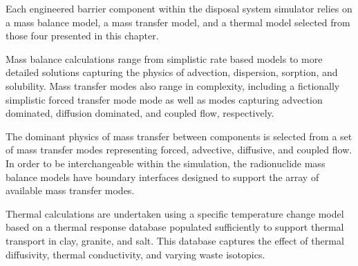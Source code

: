 Each engineered barrier component within the \Cyder disposal system simulator 
relies on a mass balance model, a mass transfer model, and a thermal model 
selected from those four presented in this chapter. 

Mass balance calculations range from simplistic rate based models to more 
detailed solutions capturing the physics of advection, dispersion, sorption, 
and solubility.  Mass transfer modes also range in complexity, including a 
fictionally simplistic forced transfer mode mode as well as modes capturing 
advection dominated, diffusion dominated, and coupled flow, respectively.  

The dominant physics of mass transfer between components is 
selected from a set of mass transfer modes representing forced, advective, 
diffusive, and coupled flow.  In order to be interchangeable within the 
simulation, the radionuclide mass balance models have boundary interfaces 
designed to support the array of available mass transfer modes. 

Thermal calculations are undertaken using a specific temperature change model 
based on a thermal response database populated sufficiently to support thermal 
transport in clay, granite, and salt. This database captures the effect of 
thermal diffusivity, thermal conductivity, and varying waste isotopics.
